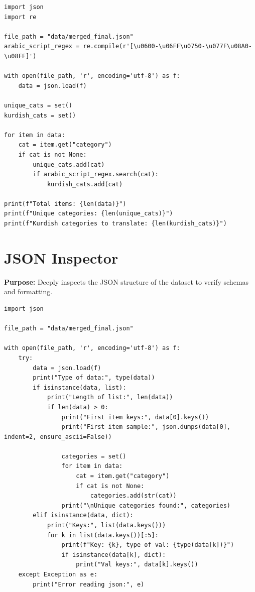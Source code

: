 \documentclass[11pt]{article}
\begin{document}
\begin{lstlisting}[style=pythoncode, caption={count\_unique\_categories.py}]
import json
import re

file_path = "data/merged_final.json"
arabic_script_regex = re.compile(r'[\u0600-\u06FF\u0750-\u077F\u08A0-\u08FF]')

with open(file_path, 'r', encoding='utf-8') as f:
    data = json.load(f)

unique_cats = set()
kurdish_cats = set()

for item in data:
    cat = item.get("category")
    if cat is not None:
        unique_cats.add(cat)
        if arabic_script_regex.search(cat):
            kurdish_cats.add(cat)

print(f"Total items: {len(data)}")
print(f"Unique categories: {len(unique_cats)}")
print(f"Kurdish categories to translate: {len(kurdish_cats)}")
\end{lstlisting}


\section{JSON Inspector} \label{sec:inspector}
\textbf{Purpose:} Deeply inspects the JSON structure of the dataset to verify schemas and formatting.

\begin{lstlisting}[style=pythoncode, caption={inspect\_json.py}]
import json

file_path = "data/merged_final.json"

with open(file_path, 'r', encoding='utf-8') as f:
    try:
        data = json.load(f)
        print("Type of data:", type(data))
        if isinstance(data, list):
            print("Length of list:", len(data))
            if len(data) > 0:
                print("First item keys:", data[0].keys())
                print("First item sample:", json.dumps(data[0], indent=2, ensure_ascii=False))
                
                categories = set()
                for item in data:
                    cat = item.get("category")
                    if cat is not None:
                        categories.add(str(cat))
                print("\nUnique categories found:", categories)
        elif isinstance(data, dict):
            print("Keys:", list(data.keys()))
            for k in list(data.keys())[:5]:
                print(f"Key: {k}, type of val: {type(data[k])}")
                if isinstance(data[k], dict):
                    print("Val keys:", data[k].keys())
    except Exception as e:
        print("Error reading json:", e)
\end{lstlisting}
\end{document}
